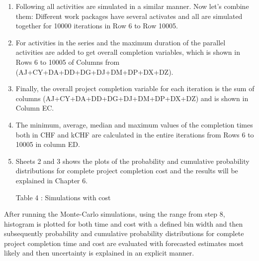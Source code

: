 \begin{enumerate}
	\item Following all activities are simulated in a similar manner. Now let's combine them: Different work packages have several activates and all are simulated together for 10000 iterations in Row 6 to Row 10005.
	
	\item For activities in the series and the maximum duration of the parallel activities are added to get overall completion variables, which is shown in Rows 6 to 10005 of Columns from (AJ+CY+DA+DD+DG+DJ+DM+DP+DX+DZ).
	
	\item Finally, the overall project completion variable for each iteration is the sum of columns (AJ+CY+DA+DD+DG+DJ+DM+DP+DX+DZ) and is shown in Column EC.
	
	\item The minimum, average, median and maximum values of the completion times both in CHF and kCHF are calculated in the entire iterations from Rows 6 to 10005 in column ED.
	
	
	\item Sheets 2 and 3 shows the plots of the probability and cumulative probability distributions for complete project completion cost and the results will be explained in Chapter 6.
	
	
	Table 4 : Simulations with cost 
	
	
\end{enumerate}

After running the Monte-Carlo simulations, using the range from step 8, histogram is plotted for both time and cost with a defined bin width and then subsequently probability and cumulative probability distributions for complete project completion time and cost are evaluated with forecasted estimates most likely and then uncertainty is explained in an explicit manner.

